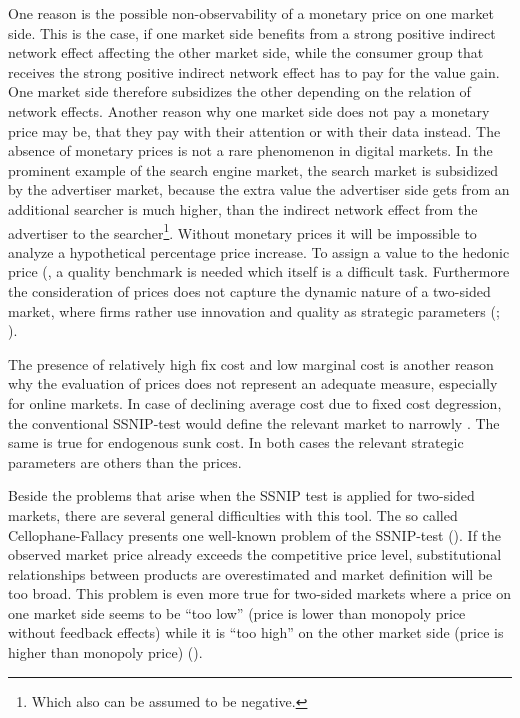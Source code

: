 \documentclass[10pt,a4paper]{scrreprt}
\begin{document}
One reason is the possible non-observability of a monetary price on one market side. This is the case, if one market side benefits from a strong positive indirect network effect affecting the other market side, while the consumer group that receives the strong positive indirect network effect has to pay for the value gain. One market side therefore subsidizes the other depending on the relation of network effects. Another reason  why one market side does not pay a monetary price may be, that they pay with their attention or with their data instead. The absence of monetary prices is not a rare phenomenon in digital markets. In the prominent example of the search engine market, the search market is subsidized by the advertiser market, because the extra value the advertiser side gets from an additional searcher is much higher, than the indirect network effect from the advertiser to the searcher\footnote{Which also can be assumed to be negative.}. Without monetary prices it will be impossible to analyze a hypothetical percentage price increase. To assign a value to the hedonic price (\cite{filistrucchi_market_2013}, a quality benchmark is needed which itself is a difficult task. Furthermore the consideration of prices does not capture the dynamic nature of a two-sided market, where firms rather use innovation and quality as strategic parameters (\cite{evans_economic_2002}; \cite{gual_market_2003}). 

The presence of relatively high fix cost and low marginal cost is another reason why the evaluation of prices does not represent an adequate measure, especially for online markets. In case of declining average cost due to fixed cost degression, the conventional SSNIP-test would define the relevant market to narrowly \cite{gual_market_2003}. The same is true for endogenous sunk cost. In both cases  the relevant strategic parameters are others than the prices.

Beside the problems that arise when the SSNIP test is applied for two-sided markets, there are several general difficulties with this tool. The so called Cellophane-Fallacy  presents one well-known problem of the SSNIP-test (\cite{schaerr_cellophane_1985}). If the observed market price already exceeds the competitive price level, substitutional relationships between products are overestimated and market definition will be too broad. This problem is even more true for two-sided markets where a price on one market side seems to be “too low” (price is lower than monopoly price without feedback effects) while it is “too high” on the other market side (price is higher than monopoly price) (\cite{dewenter_einfuehrung_2014}).
\end{document}
